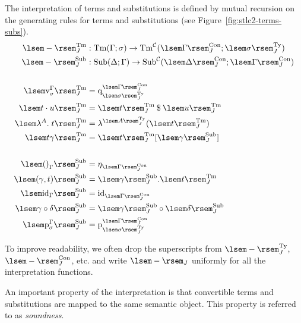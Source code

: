\begin{defn}
\begin{enum}
\item The interpretation of terms and substitutions is defined by mutual recursion on the generating rules for terms and substitutions (see Figure~\ref{fig:stlc2-terms-subs}).
\begin{align*}
\cinttm[J]{-} &: \sTm{\Gamma}{\sigma} \to \STm[\cintcon[J]{\Gamma}]{\cintty[J]{\sigma}}[\cat{C}] \\
\cintsub[J]{-} &: \sSub{\Delta}{\Gamma} \to \SSub{\cintcon[J]{\Delta}}{\cintcon[J]{\Gamma}}[\cat{C}] \\
\\
\cinttm[J]{\vz[\Gamma][\sigma]} &= \Sq[\cintcon[J]{\Gamma}][\cintty[J]{\sigma}] \\
\cinttm[J]{\app{t}{u}} &= \Sapp{\cinttm[J]{t}}{\cinttm[J]{u}} \\
\cinttm[J]{\slam{A}{t}} &= \Slam{\cintty[J]{A}}{\cinttm[J]{t}} \\
\cinttm[J]{\ssubst{t}{\gamma}} &= \Ssubst{\cinttm[J]{t}}{\cintsub[J]{\gamma}} \\
\\
\cintsub[J]{\sempsub[\Gamma]} &= \Sempsub[\cintcon[J]{\Gamma}] \\
\cintsub[J]{\sextsub{\gamma}{t}} &= \Sextsub{\cintsub[J]{\gamma}}{\cinttm[J]{t}} \\
\cintsub[J]{\sidsub[\Gamma]} &= \Sidsub[\cintcon[J]{\Gamma}] \\
\cintsub[J]{\scompsub{\gamma}{\delta}} &=
    \Scompsub{\cintsub[J]{\gamma}}{\cintsub[J]{\delta}} \\
\cintsub[J]{\spsub[\Gamma][\sigma]} &=
    \Spsub[\cintcon[J]{\Gamma}][\cintty[J]{\sigma}]
\end{align*}
\end{enum}
\end{defn}

To improve readability, we often drop the superscripts from $\cintty[J]{-}$, $\cintcon[J]{-}$, etc. and write $\cint[J]{-}$ uniformly for all the interpretation functions.

An important property of the interpretation is that convertible terms and substitutions are mapped to the same semantic object. This property is referred to as \textit{soundness}.

